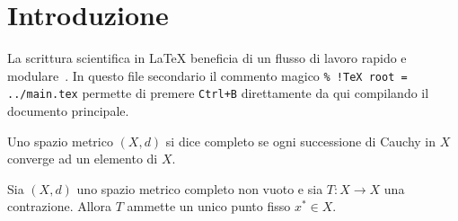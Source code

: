 \section{Introduzione}\label{sec:intro}

La scrittura scientifica in \LaTeX{} beneficia di un flusso di lavoro rapido e modulare~\cite{knuth1984,lamport1994}.
In questo file secondario il commento magico \texttt{\% !TeX root = ../main.tex} permette di
premere \texttt{Ctrl+B} direttamente da qui compilando il documento principale.

\begin{definition}\label{def:completo}
Uno spazio metrico $(X, d)$ si dice completo se ogni successione di Cauchy in $X$ converge ad un elemento di $X$.
\end{definition}

\begin{theorem}\label{thm:banach}
Sia $(X, d)$ uno spazio metrico completo non vuoto e sia $T : X \to X$ una contrazione.
Allora $T$ ammette un unico punto fisso $x^* \in X$.
\end{theorem}

